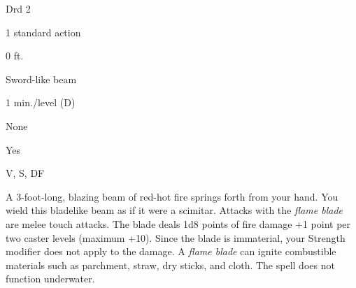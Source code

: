 
\begin{description*}
\item[Level:] Drd 2
\item[Casting Time:] 1 standard action
\item[Range:] 0 ft.
\item[Effect:] Sword-like beam
\item[Duration:] 1 min./level (D)
\item[Saving Throw:] None
\item[Spell Resistance:] Yes
\item[Components:] V, S, DF
\end{description*}

A 3-foot-long, blazing beam of red-hot fire springs forth from your hand. You wield
this bladelike beam as if it were a scimitar. Attacks with the \textit{flame blade
}are melee touch attacks. The blade deals 1d8 points of fire damage +1 point per
two caster levels (maximum +10). Since the blade is immaterial, your Strength modifier
does not apply to the damage. A \textit{flame blade} can ignite combustible materials
such as parchment, straw, dry sticks, and cloth.
The spell does not function underwater.